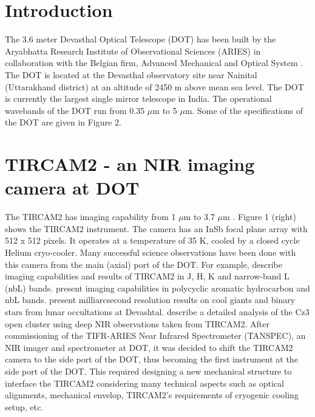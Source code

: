 \documentclass{jaa}
\begin{document}

\artcitid{\#\#\#\#}
\setcounter{page}{1}
\setcounter{page}{1}


\section{Introduction}


The 3.6 meter Devasthal Optical Telescope (DOT) has been built by the Aryabhatta Research Institute of Observational Sciences (ARIES) in collaboration with the Belgian firm, Advanced Mechanical and Optical System \citep[AMOS, see Figure 1 (left),][]{2019CSci..117..365S}. The DOT is located at the Devasthal observatory site near Nainital (Uttarakhand district) at an altitude of 2450 m above mean sea level. The DOT is currently the largest single mirror telescope in India.  The operational wavebands of the DOT run from 0.35 $\mu$m to 5 $\mu$m. Some of the specifications of the DOT are given in Figure 2.


\section{TIRCAM2 - an NIR imaging camera at DOT}

The TIRCAM2 has imaging capability from 1 $\mu$m to 3.7 $\mu$m \citep{2012BASI...40..531N,2018JAI.....750003B}. Figure 1 (right) shows the TIRCAM2 instrument. The camera has an InSb focal plane array with 512 x 512 pixels. It operates at a temperature of 35 K, cooled by a closed cycle Helium cryo-cooler. Many successful science observations have been done with this camera from the main (axial) port of the DOT. For example,
\citet{2018JAI.....750003B} describe imaging capabilities and results of TIRCAM2 in 
J, H, K and narrow-band L (nbL) bands. \citet{2020JApA...41...27A} present imaging capabilities in polycyclic aromatic hydrocarbon and nbL bands. \citep{2020MNRAS.498.2263R}
present milliarcsecond resolution results on cool giants and binary stars from lunar occultations at Devashtal. \citet{2020MNRAS.498.2309S} describe a detailed analysis of the Cz3 open cluster using deep NIR observations taken from TIRCAM2.
After commissioning of the TIFR-ARIES Near Infrared Spectrometer (TANSPEC), an NIR imager and spectrometer at DOT, it was decided to shift the TIRCAM2 camera to the side port of the DOT, thus becoming the first instrument at the side port of the DOT. This required designing a new mechanical structure to interface the TIRCAM2 considering many technical aspects such as optical alignments, mechanical envelop, TIRCAM2's requirements of cryogenic cooling setup, etc.
\end{document}
